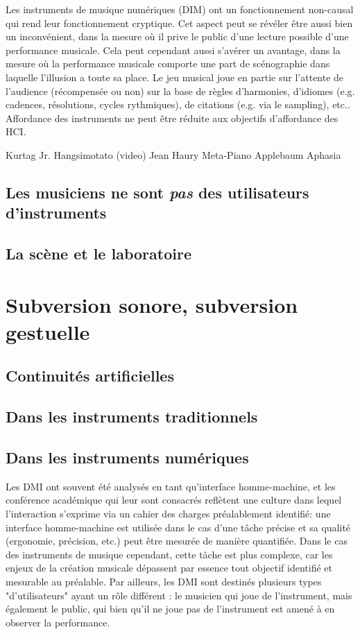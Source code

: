 Les instruments de musique numériques (DIM) ont un fonctionnement non-causal qui rend leur fonctionnement cryptique. Cet aspect peut se révéler être aussi bien un inconvénient, dans la mesure où il prive le public d’une lecture possible d’une performance musicale. Cela peut cependant aussi s’avérer un avantage, dans la mesure où la performance musicale comporte une part de scénographie dans laquelle l’illusion a toute sa place.
Le jeu musical joue en partie sur l’attente de l’audience (récompensée ou non) sur la base de règles d'harmonies, d’idiomes (e.g. cadences, résolutions, cycles rythmiques), de citations (e.g. via le sampling), etc..
Affordance des instruments ne peut être réduite aux objectifs d’affordance des HCI.


Kurtag Jr. Hangsimotato (video)
Jean Haury Meta-Piano
Applebaum Aphasia

\subsection{Les musiciens ne sont \emph{pas} des utilisateurs d'instruments}
\subsection{La scène et le laboratoire}


\section{Subversion sonore, subversion gestuelle}

\subsection{Continuités artificielles}

\subsection{Dans les instruments traditionnels}

\subsection{Dans les instruments numériques}


Les DMI ont souvent été analysés en tant qu'interface homme-machine, et les conférence académique qui leur sont consacrés reflètent une culture dans lequel l'interaction s'exprime via un cahier des charges préalablement identifié: une interface homme-machine est utilisée dans le cas d'une tâche précise et sa qualité (ergonomie, précision, etc.) peut être mesurée de manière quantifiée.
Dans le cas des instruments de musique cependant, cette tâche est plus complexe, car les enjeux de la création musicale dépassent par essence tout objectif identifié et mesurable au préalable. Par ailleurs, les DMI sont destinés plusieurs types "d'utilisateurs" ayant un rôle différent : le musicien qui joue de l'instrument, mais également le public, qui bien qu'il ne joue pas de l'instrument est amené à en observer la performance.

